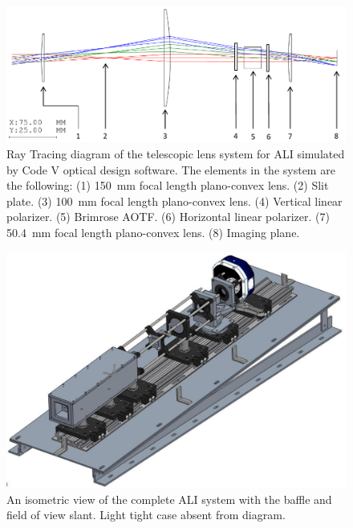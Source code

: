 \documentclass[12pt]{article}
\begin{document}
\newpage

\begin{figure}
    \includegraphics[width=1.0\textwidth]{./Images/3-2-TelescopicRayTracing.pdf}
    \caption{Ray Tracing diagram of the telescopic lens system for ALI simulated by Code V optical design software. The elements in the system are the following: (1) 150~mm focal length plano-convex lens. (2) Slit plate. (3) 100~mm focal length plano-convex lens. (4) Vertical linear polarizer. (5) Brimrose AOTF. (6) Horizontal linear polarizer. (7) 50.4~mm focal length plano-convex lens. (8) Imaging plane.}
    \label{fig:3.2:telescopicRayTracing}
\end{figure}

\newpage

\begin{figure}[h!]
        \centering
        \includegraphics[width=1.0\textwidth]{./Images/3-3-AliCompleteDesign.pdf}
        \caption{An isometric view of the complete ALI system with the baffle and field of view slant. Light tight case absent from diagram.}
        \label{fig:3.3:aliSystemDiagram}
\end{figure}
\end{document}
